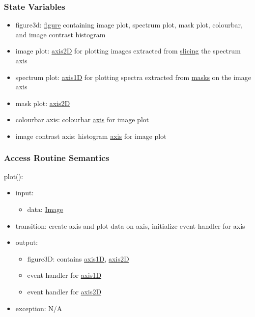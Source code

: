 \documentclass[12pt, titlepage]{article}
\begin{document}
\subsubsection{State Variables}
\begin{itemize}
    \item figure3d: \hyperref[Mod:Plotting]{figure} containing image plot,
    spectrum plot, mask plot, colourbar, and image contrast histogram
    \item image plot: \hyperref[Mod:Plotting]{axis2D} for plotting images extracted
    from \hyperref[Mod:Slice1D]{slicing} the spectrum axis
    \item spectrum plot: \hyperref[Mod:Plotting]{axis1D} for plotting spectra
    extracted from \hyperref[Mod:Mask2D]{masks} on the image axis
    \item mask plot: \hyperref[Mod:Plotting]{axis2D}
    \item colourbar axis: colourbar \hyperref[Mod:Plotting]{axis} for image plot
    \item image contrast axis: histogram \hyperref[Mod:Plotting]{axis} for image
    plot
\end{itemize}

\subsubsection{Access Routine Semantics}

\noindent plot():
\begin{itemize}
    \item input:
    \begin{itemize}
        \item data: \hyperref[Mod:Image]{Image}
    \end{itemize}
    \item transition: create axis and plot data on axis, initialize event
    handler for axis
    \item output:
    \begin{itemize}
        \item figure3D: contains \hyperref[Mod:Plotting]{axis1D},
        \hyperref[Mod:Plotting]{axis2D}
        \item event handler for \hyperref[Mod:Plotting]{axis1D}
        \item event handler for \hyperref[Mod:Plotting]{axis2D}
    \end{itemize}
    \item exception: N/A
\end{itemize}
\end{document}
